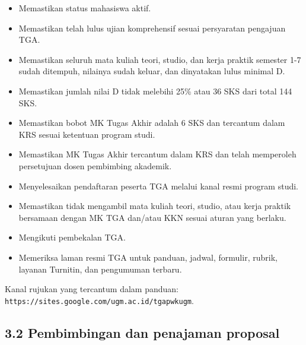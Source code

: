 \documentclass[
  indonesian,
  11pt,
]{article}
\providecommand{\tightlist}{%
  \setlength{\itemsep}{0pt}\setlength{\parskip}{0pt}}
\renewcommand{\tightlist}{%
  \setlength{\itemsep}{0.22em}%
  \setlength{\parskip}{0pt}%
}
\begin{document}
\begin{itemize}
\tightlist
\item[$\square$]
  Memastikan status mahasiswa aktif.
\item[$\square$]
  Memastikan telah lulus ujian komprehensif sesuai persyaratan pengajuan
  TGA.
\item[$\square$]
  Memastikan seluruh mata kuliah teori, studio, dan kerja praktik
  semester 1-7 sudah ditempuh, nilainya sudah keluar, dan dinyatakan
  lulus minimal D.
\item[$\square$]
  Memastikan jumlah nilai D tidak melebihi 25\% atau 36 SKS dari total
  144 SKS.
\item[$\square$]
  Memastikan bobot MK Tugas Akhir adalah 6 SKS dan tercantum dalam KRS
  sesuai ketentuan program studi.
\item[$\square$]
  Memastikan MK Tugas Akhir tercantum dalam KRS dan telah memperoleh
  persetujuan dosen pembimbing akademik.
\item[$\square$]
  Menyelesaikan pendaftaran peserta TGA melalui kanal resmi program
  studi.
\item[$\square$]
  Memastikan tidak mengambil mata kuliah teori, studio, atau kerja
  praktik bersamaan dengan MK TGA dan/atau KKN sesuai aturan yang
  berlaku.
\item[$\square$]
  Mengikuti pembekalan TGA.
\item[$\square$]
  Memeriksa laman resmi TGA untuk panduan, jadwal, formulir, rubrik,
  layanan Turnitin, dan pengumuman terbaru.
\end{itemize}

Kanal rujukan yang tercantum dalam panduan:
\texttt{https://sites.google.com/ugm.ac.id/tgapwkugm}.

\subsection{3.2 Pembimbingan dan penajaman
proposal}\label{pembimbingan-dan-penajaman-proposal}
\end{document}
